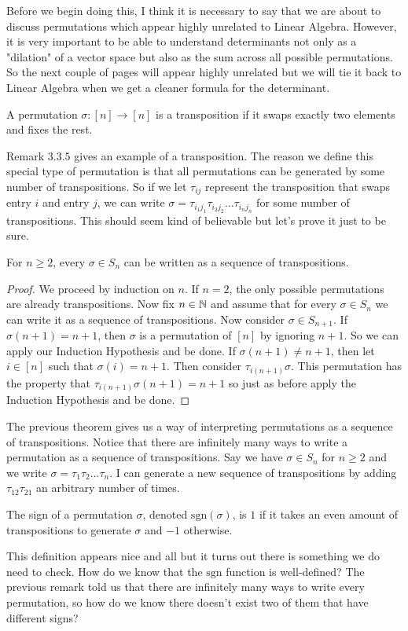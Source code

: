 Before we begin doing this, I think it is necessary to say that we are about to discuss permutations which appear highly unrelated to Linear Algebra. However, it is very important to be able to understand determinants not only as a "dilation" of a vector space but also as the sum across all possible permutations. So the next couple of pages will appear highly unrelated but we will tie it back to Linear Algebra when we get a cleaner formula for the determinant.
\begin{definition}
    A permutation $\sigma: [n]\to[n]$ is a transposition if it swaps exactly two elements and fixes the rest.
\end{definition}
Remark $3.3.5$ gives an example of a transposition. The reason we define this special type of permutation is that all permutations can be generated by some number of transpositions. So if we let $\tau_{ij}$ represent the transposition that swaps entry $i$ and entry $j$, we can write $\sigma=\tau_{i_1j_1}\tau_{i_2j_2}\dots\tau_{i_nj_n}$ for some number of transpositions. This should seem kind of believable but let's prove it just to be sure.
\begin{theorem}
    For $n\geq 2$, every $\sigma\in S_n$ can be written as a sequence of transpositions.
\end{theorem}
\begin{proof}
    We proceed by induction on $n$. If $n=2$, the only possible permutations are already transpositions. Now fix $n\in\mathbb{N}$ and assume that for every $\sigma\in S_n$ we can write it as a sequence of transpositions. Now consider $\sigma\in S_{n+1}$. If $\sigma(n+1)=n+1$, then $\sigma$ is a permutation of $[n]$ by ignoring $n+1$. So we can apply our Induction Hypothesis and be done. If $\sigma(n+1)\neq n+1$, then let $i\in [n]$ such that $\sigma(i)=n+1$. Then consider $\tau_{i(n+1)}\sigma$. This permutation has the property that $\tau_{i(n+1)}\sigma(n+1)=n+1$ so just as before apply the Induction Hypothesis and be done.
\end{proof}
\begin{remark}
    The previous theorem gives us a way of interpreting permutations as a sequence of transpositions. Notice that there are infinitely many ways to write a permutation as a sequence of transpositions. Say we have $\sigma\in S_n$ for $n\geq 2$ and we write $\sigma=\tau_1\tau_2\dots\tau_n$. I can generate a new sequence of transpositions by adding $\tau_{12}\tau_{21}$ an arbitrary number of times.
\end{remark}
\begin{definition}
    The sign of a permutation $\sigma$, denoted $\text{sgn}(\sigma)$, is $1$ if it takes an even amount of transpositions to generate $\sigma$ and $-1$ otherwise.
\end{definition}
This definition appears nice and all but it turns out there is something we do need to check. How do we know that the $\text{sgn}$ function is well-defined? The previous remark told us that there are infinitely many ways to write every permutation, so how do we know there doesn't exist two of them that have different signs?

